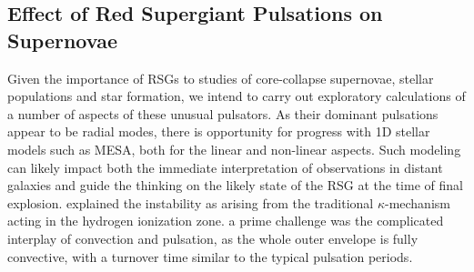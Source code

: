 \subsection{Effect of Red Supergiant Pulsations on Supernovae}

Given the importance of RSGs to studies of core-collapse supernovae, stellar populations and star formation, we intend to carry out exploratory calculations of a number of aspects of these unusual pulsators. As their dominant pulsations appear to be radial modes, there is opportunity for progress with 1D stellar models such as MESA, both for the linear and non-linear aspects. {\color{green} Such modeling can likely impact both the immediate interpretation of observations in distant galaxies and guide the thinking on the likely state of the RSG at the time of final explosion.} \citet{1997AampA...327..224H}  explained the instability  as arising from the traditional $\kappa$-mechanism acting in the hydrogen ionization zone. 
a prime challenge was the complicated interplay of convection and pulsation, as the whole outer envelope is fully convective, with a turnover time similar to the typical pulsation periods.